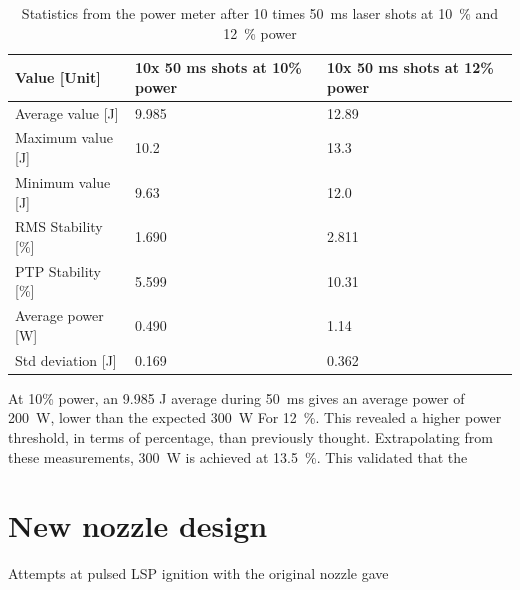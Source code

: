                 \begin{table}[!ht]
                    \caption{Statistics from the power meter after 10 times \qty{50}{ms} laser shots at \qty{10}{\%} and \qty{12}{\%} power}
                    \label{tab:laser shot statistics}
                    \begin{tabular}{lll}
                    \textbf{Value {[}Unit{]}} & \textbf{10x 50 ms shots at 10\% power} & \textbf{10x 50 ms shots at 12\% power} \\ \hline
                    Average value {[}J{]}  & 9.985 & 12.89 \\
                    Maximum value {[}J{]}  & 10.2  & 13.3  \\
                    Minimum value {[}J{]}  & 9.63  & 12.0  \\
                    RMS Stability {[}\%{]} & 1.690 & 2.811 \\
                    PTP Stability {[}\%{]} & 5.599 & 10.31 \\
                    Average power {[}W{]}  & 0.490 & 1.14  \\
                    Std deviation {[}J{]}  & 0.169 & 0.362 \\ \hline
                    \end{tabular}
                \end{table}
                
                At 10\% power, an 9.985 J average during \qty{50}{ms} gives an average power of \qty{200}{W}, lower than the expected \qty{300}{W} For \qty{12}{\%}. This revealed a higher power threshold, in terms of percentage, than previously thought. Extrapolating from these measurements, \qty{300}{W} is achieved at \qty{13.5}{\%}. This validated that the

            \section{New nozzle design}

                Attempts at pulsed LSP ignition with the original nozzle gave 
                
